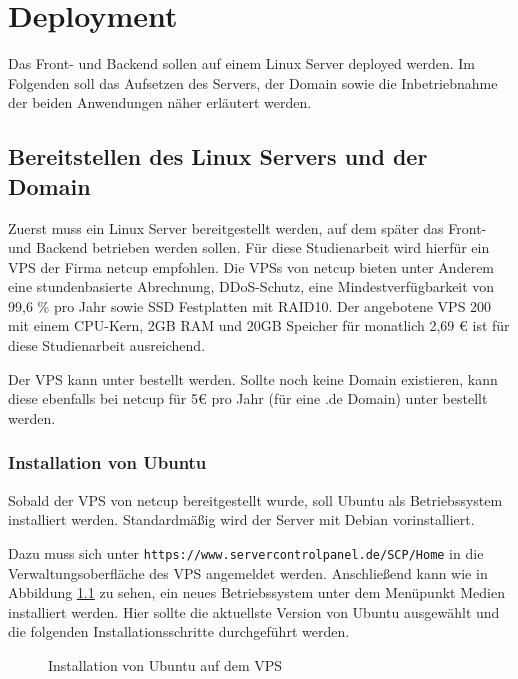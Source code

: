 \chapter{Deployment}

Das Front- und Backend sollen auf einem Linux Server deployed werden. Im Folgenden soll das Aufsetzen des Servers, der Domain sowie die Inbetriebnahme der beiden Anwendungen näher erläutert werden.

\section{Bereitstellen des Linux Servers und der Domain}

Zuerst muss ein Linux Server bereitgestellt werden, auf dem später das Front- und Backend betrieben werden sollen. Für diese Studienarbeit wird hierfür ein \ac{VPS} der Firma netcup empfohlen. Die \acp{VPS} von netcup bieten unter Anderem eine stundenbasierte Abrechnung, DDoS-Schutz, eine Mindestverfügbarkeit von 99,6 \% pro Jahr sowie SSD Festplatten mit RAID10. Der angebotene \ac{VPS} 200 mit einem CPU-Kern, 2GB RAM und 20GB Speicher für monatlich 2,69 € \cite[vgl.][]{NetcupVPS} ist für diese Studienarbeit ausreichend.

Der \ac{VPS} kann unter \cite{NetcupVPS} bestellt werden. Sollte noch keine Domain existieren, kann diese ebenfalls bei netcup für 5€ pro Jahr (für eine .de Domain) unter \cite{NetcupDomains} bestellt werden.

\subsection{Installation von Ubuntu}
Sobald der \ac{VPS} von netcup bereitgestellt wurde, soll Ubuntu als Betriebssystem installiert werden. Standardmäßig wird der Server mit Debian vorinstalliert.

Dazu muss sich unter \lstinline{https://www.servercontrolpanel.de/SCP/Home} in die Verwaltungsoberfläche des \ac{VPS} angemeldet werden. Anschließend kann wie in Abbildung \ref{fig:netcup-ubuntu-installation} zu sehen, ein neues Betriebssystem unter dem Menüpunkt \glqq Medien\grqq{} installiert werden. Hier sollte die aktuellste Version von Ubuntu ausgewählt und die folgenden Installationsschritte durchgeführt werden.

\begin{figure}[H]
  \setlength{\fboxsep}{0pt}
  \setlength{\fboxrule}{0.5pt}
  \centering
  \caption[Installation von Ubuntu auf dem VPS]{Installation von Ubuntu auf dem VPS}
  \label{fig:netcup-ubuntu-installation}
\end{figure}

